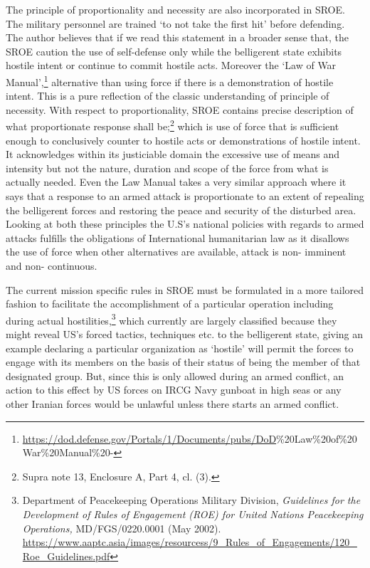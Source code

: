 \begin{multicols}{2}
\noi
The principle of proportionality and necessity are also incorporated in SROE. The military
personnel are trained ‘to not take the first hit’ before defending. The author believes that if
we read this statement in a broader sense that, the SROE caution the use of self-defense only
while the belligerent state exhibits hostile intent or continue to commit hostile acts.
Moreover the ‘Law of War Manual’,\footnote{\url{https://dod.defense.gov/Portals/1/Documents/pubs/DoD}\%20Law\%20of\%20War\%20Manual\%20-}
alternative than using force if there is a demonstration of hostile intent. This is a pure
reflection of the classic understanding of principle of necessity. With respect to
proportionality, SROE contains precise description of what proportionate response shall
be;\footnote{Supra note 13, Enclosure A, Part 4, cl. (3).}  which is use of force that is sufficient enough to conclusively counter to hostile acts or
demonstrations of hostile intent. It acknowledges within its justiciable domain the excessive
use of means and intensity but not the nature, duration and scope of the force from what is
actually needed. Even the Law Manual takes a very similar approach where it says that a
response to an armed attack is proportionate to an extent of repealing the belligerent forces
and restoring the peace and security of the disturbed area. Looking at both these principles
the U.S’s national policies with regards to armed attacks fulfills the obligations of
International humanitarian law as it disallows the use of force when other alternatives are
available, attack is non- imminent and non- continuous.

\noi
The current mission specific rules in SROE must be formulated in a more tailored fashion to
facilitate the accomplishment of a particular operation including during actual hostilities,\footnote{Department of Peacekeeping Operations Military Division, \textit{Guidelines for the Development of Rules of
Engagement (ROE) for United Nations Peacekeeping Operations,} MD/FGS/0220.0001 (May 2002).
 \url{https://www.aaptc.asia/images/resourcess/9_Rules_of_Engagements/120_Roe_Guidelines.pdf}}
which currently are largely classified because they might reveal US’s forced tactics,
techniques etc. to the belligerent state, giving an example declaring a particular organization
as ‘hostile’ will permit the forces to engage with its members on the basis of their status of
being the member of that designated group. But, since this is only allowed during an armed
conflict, an action to this effect by US forces on IRCG Navy gunboat in high seas or any other
Iranian forces would be unlawful unless there starts an armed conflict.


\end{multicols}
